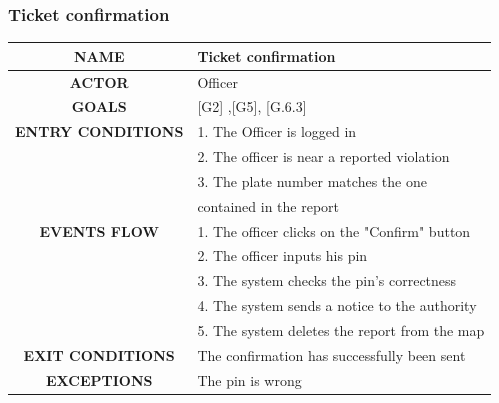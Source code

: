\documentclass[12pt,a4paper]{article}
\begin{document}
\subsubsection{Ticket confirmation}
		\begin{center}
			\begin{tabular}{| c | l |}
				\hline
				\textbf{NAME} & Ticket confirmation \\
				\hline
				\textbf{ACTOR} & Officer \\
				\hline
				\textbf{GOALS} & [G2] ,[G5], [G.6.3] \\
				\hline
				\textbf{ENTRY CONDITIONS} &1. The Officer is logged in \\
				&2. The officer is near a reported violation \\
				&3. The plate number matches the one \\
				& contained in the report\\ \hline
				\textbf{EVENTS FLOW}  &
				1. The officer clicks on the "Confirm" button\\
				&2. The officer inputs his pin \\
				&3. The system checks the pin's correctness \\
				&4. The system sends a notice to the authority \\
				&5. The system deletes the report from the map \\ 
				\hline
				\textbf{EXIT CONDITIONS}  & The confirmation has successfully been sent \\ \hline
				\textbf{EXCEPTIONS} &
			 The pin is wrong \\
				\hline
			\end{tabular}
		\end{center}
\end{document}
